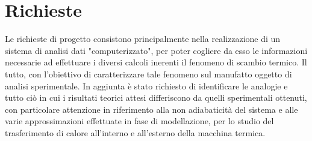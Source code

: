 \documentclass[a4paper,10pt]{article}                                                                                       %
\begin{document}
\tableofcontents                                                                                                            %
\vspace{1.5cm}                                                                                                              %
\listoftables                                                                                                               %
\vspace{1.5cm}                                                                                                              %
\listoffigures                                                                                                              %
\pagebreak                                                                                                                  %

\section{Richieste}                                                                                                         %
\label{sec:project_request}                                                                                                 %
  Le richieste di progetto consistono principalmente nella realizzazione di un sistema di analisi dati "computerizzato",
  per poter cogliere da esso le informazioni necessarie ad effettuare i diversi calcoli inerenti il fenomeno di scambio
  termico. Il tutto, con l'obiettivo di caratterizzare tale fenomeno sul manufatto oggetto di analisi sperimentale. In
  aggiunta è stato richiesto di identificare le analogie e tutto ciò in cui i risultati teorici attesi differiscono da
  quelli sperimentali ottenuti, con particolare attenzione in riferimento alla non adiabaticità del sistema e alle varie
  approssimazioni effettuate in fase di modellazione, per lo studio del trasferimento di calore all'interno e all'esterno
  della macchina termica.
\end{document}
